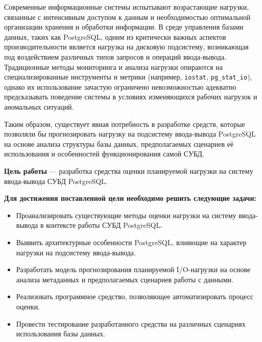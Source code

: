 Современные информационные системы испытывают возрастающие нагрузки, связанные с интенсивным доступом к данным 
и необходимостью оптимальной организации хранения и обработки информации. В среде управления базами данных, 
таких как PostgreSQL, одним из критически важных аспектов производительности является нагрузка на дисковую подсистему, 
возникающая под воздействием различных типов запросов и операций ввода-вывода. Традиционные методы мониторинга и 
анализа нагрузки опираются на специализированные инструменты и метрики (например, \texttt{iostat}, \texttt{pg\_stat\_io}), 
однако их использование зачастую ограничено невозможностью адекватно предсказывать поведение системы в условиях изменяющихся 
рабочих нагрузок и аномальных ситуаций.


Та\-ким об\-ра\-зом, су\-ще\-ству\-ет яв\-ная по\-треб\-ность в раз\-ра\-бот\-ке средств, ко\-то\-рые поз\-во\-ля\-ли 
бы про\-гно\-зи\-ро\-вать на\-груз\-ку на под\-си\-сте\-му вво\-да-вы\-во\-да Post\-gre\-SQL на ос\-но\-ве ана\-ли\-за 
струк\-ту\-ры ба\-зы дан\-ных, пред\-по\-ла\-га\-е\-мых сце\-на\-ри\-ев её ис\-поль\-зо\-ва\-ния и осо\-бен\-но\-стей 
функ\-ци\-о\-ни\-ро\-ва\-ния са\-мой \mbox{СУБД}.
\vspace{5mm}

\textbf{Цель работы} — разработка средства оценки планируемой нагрузки на систему ввода-вывода СУБД PostgreSQL.\

\vspace{5mm}

\textbf{Для достижения поставленной цели необходимо решить следующие задачи:}
\begin{itemize}[leftmargin=*,align=left]
    \item Про\-анализи\-ровать су\-ще\-ствую\-щие ме\-то\-ды оцен\-ки на\-груз\-ки на си\-сте\-му вво\-да-вы\-во\-да в кон\-тек\-сте ра\-бо\-ты \mbox{СУБД} PostgreSQL.\
    \item Вы\-я\-вить ар\-хи\-тек\-тур\-ные осо\-бен\-но\-сти Post\-gre\-SQL, вли\-яю\-щие на ха\-рак\-тер на\-груз\-ки на под\-си\-сте\-му вво\-да-вы\-во\-да.\
    \item Раз\-ра\-бо\-тать мо\-дель про\-гно\-зи\-ро\-ва\-ния пла\-ни\-ру\-е\-мой I/O-на\-груз\-ки на ос\-но\-ве ана\-ли\-за ме\-та\-дан\-ных и пред\-по\-ла\-га\-е\-мых сце\-на\-ри\-ев ра\-бо\-ты с дан\-ны\-ми.\
    \item Ре\-а\-ли\-зо\-вать про\-грамм\-ное сред\-ство, по\-зво\-ля\-ю\-щее ав\-то\-ма\-ти\-зи\-ро\-вать про\-цесс оцен\-ки.\
    \item Про\-вес\-ти тес\-ти\-ро\-ва\-ние раз\-ра\-бо\-тан\-но\-го сред\-ства на раз\-лич\-ных сце\-на\-ри\-ях ис\-поль\-зо\-ва\-ния ба\-зы дан\-ных.\
\end{itemize}


